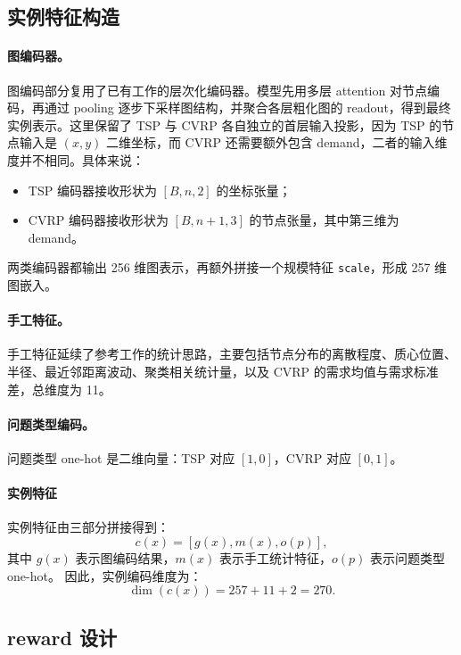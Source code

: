 \subsection{实例特征构造}

\paragraph{图编码器。}
图编码部分复用了已有工作\cite{gao2025nss}的层次化编码器。模型先用多层 attention 对节点编码，再通过 pooling 逐步下采样图结构，并聚合各层粗化图的 readout，得到最终实例表示。这里保留了 TSP 与 CVRP 各自独立的首层输入投影，因为 TSP 的节点输入是 $(x,y)$ 二维坐标，而 CVRP 还需要额外包含 demand，二者的输入维度并不相同。具体来说：
\begin{itemize}
  \item TSP 编码器接收形状为 $[B, n, 2]$ 的坐标张量；
  \item CVRP 编码器接收形状为 $[B, n+1, 3]$ 的节点张量，其中第三维为 demand。
\end{itemize}
两类编码器都输出 256 维图表示，再额外拼接一个规模特征 \texttt{scale}，形成 257 维图嵌入。

\paragraph{手工特征。}
手工特征延续了参考工作\cite{gao2025nss}的统计思路，主要包括节点分布的离散程度、质心位置、半径、最近邻距离波动、聚类相关统计量，以及 CVRP 的需求均值与需求标准差，总维度为 11。

\paragraph{问题类型编码。}
问题类型 one-hot 是二维向量：TSP 对应 $[1,0]$，CVRP 对应 $[0,1]$。

\paragraph{实例特征}
实例特征由三部分拼接得到：
\begin{equation}
  c(x) = [g(x), m(x), o(p)],
  \label{eq:context}
\end{equation}
其中 $g(x)$ 表示图编码结果，$m(x)$ 表示手工统计特征，$o(p)$ 表示问题类型 one-hot。
因此，实例编码维度为：
\begin{equation}
  \dim(c(x)) = 257 + 11 + 2 = 270.
\end{equation}

\subsection{reward 设计}

